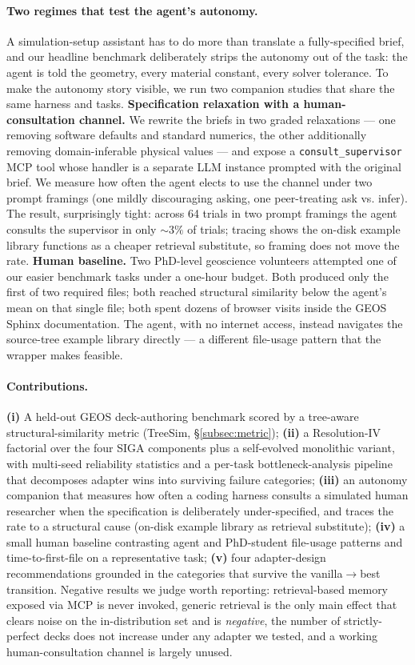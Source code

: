 \documentclass{article}
\begin{document}
\paragraph{Two regimes that test the agent's autonomy.}
A simulation-setup assistant has to do more than translate a fully-specified brief, and our headline benchmark deliberately strips the autonomy out of the task: the agent is told the geometry, every material constant, every solver tolerance. To make the autonomy story visible, we run two companion studies that share the same harness and tasks. \textbf{Specification relaxation with a human-consultation channel.} We rewrite the briefs in two graded relaxations --- one removing software defaults and standard numerics, the other additionally removing domain-inferable physical values --- and expose a \texttt{consult\_supervisor} MCP tool whose handler is a separate LLM instance prompted with the original brief. We measure how often the agent elects to use the channel under two prompt framings (one mildly discouraging asking, one peer-treating ask vs. infer). The result, surprisingly tight: across 64 trials in two prompt framings the agent consults the supervisor in only ${\sim}3\%$ of trials; tracing shows the on-disk example library functions as a cheaper retrieval substitute, so framing does not move the rate. \textbf{Human baseline.} Two PhD-level geoscience volunteers attempted one of our easier benchmark tasks under a one-hour budget. Both produced only the first of two required files; both reached structural similarity below the agent's mean on that single file; both spent dozens of browser visits inside the GEOS Sphinx documentation. The agent, with no internet access, instead navigates the source-tree example library directly --- a different file-usage pattern that the wrapper makes feasible.

\paragraph{Contributions.}
\textbf{(i)} A held-out GEOS deck-authoring benchmark scored by a tree-aware structural-similarity metric (TreeSim, \S\ref{subsec:metric}); \textbf{(ii)} a Resolution-IV factorial over the four SIGA components plus a self-evolved monolithic variant, with multi-seed reliability statistics and a per-task bottleneck-analysis pipeline that decomposes adapter wins into surviving failure categories; \textbf{(iii)} an autonomy companion that measures how often a coding harness consults a simulated human researcher when the specification is deliberately under-specified, and traces the rate to a structural cause (on-disk example library as retrieval substitute); \textbf{(iv)} a small human baseline contrasting agent and PhD-student file-usage patterns and time-to-first-file on a representative task; \textbf{(v)} four adapter-design recommendations grounded in the categories that survive the vanilla$\to$best transition. Negative results we judge worth reporting: retrieval-based memory exposed via MCP is never invoked, generic retrieval is the only main effect that clears noise on the in-distribution set and is \emph{negative}, the number of strictly-perfect decks does not increase under any adapter we tested, and a working human-consultation channel is largely unused.
\end{document}
